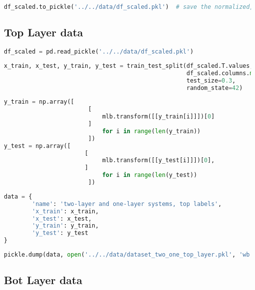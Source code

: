 \begin{lstlisting}[language=Python]
df_scaled.to_pickle('../../data/df_scaled.pkl')  # save the normalized, scaled df
\end{lstlisting}

\hypertarget{top-layer-data}{%
\subsection{Top Layer data}\label{top-layer-data}}

\begin{lstlisting}[language=Python]
df_scaled = pd.read_pickle('../../data/df_scaled.pkl')
\end{lstlisting}

\begin{lstlisting}[language=Python]
x_train, x_test, y_train, y_test = train_test_split(df_scaled.T.values,
                                                    df_scaled.columns.map(lambda x: x.split('_')[0]), # first part of the filename is the top label
                                                    test_size=0.3,
                                                    random_state=42)
\end{lstlisting}

\begin{lstlisting}[language=Python]
y_train = np.array([    
                        [
                            mlb.transform([[y_train[i]]])[0]
                        ] 
                            for i in range(len(y_train))
                        ])
y_test = np.array([ 
                       [
                            mlb.transform([[y_test[i]]])[0],
                       ] 
                            for i in range(len(y_test))
                        ])
\end{lstlisting}

\begin{lstlisting}[language=Python]
data = {
        'name': 'two-layer and one-layer systems, top labels',
        'x_train': x_train,
        'x_test': x_test,
        'y_train': y_train,
        'y_test': y_test
}
\end{lstlisting}

\begin{lstlisting}[language=Python]
pickle.dump(data, open('../../data/dataset_two_one_top_layer.pkl', 'wb'))
\end{lstlisting}

\hypertarget{bot-layer-data}{%
\subsection{Bot Layer data}\label{bot-layer-data}}

